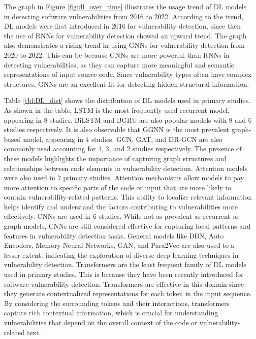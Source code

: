 The graph in Figure \ref{fig:dl_over_time} illustrates the usage trend of DL models in detecting software vulnerabilities from 2016 to 2022. According to the trend, DL models were first introduced in 2016 for vulnerability detection, since then the use of RNNs for vulnerability detection showed an upward trend. %
The graph also demonstrates a rising trend in using GNNs for vulnerability detection from 2020 to 2022. This can be because GNNs are more powerful than RNNs in detecting vulnerabilities, as they can capture more meaningful and semantic representations of input source code. Since vulnerability types often have complex structures, GNNs are an excellent fit for detecting hidden structural information.







 
Table \ref{tbl:DL_dist} shows the distribution of DL models used in primary studies. As shown in the table, LSTM is the most frequently used recurrent model, appearing in 8 studies. BiLSTM and BGRU are also popular models with 8 and 6 studies respectively. It is also observable that GGNN is the most prevalent graph-based model, appearing in 4 studies. GCN, GAT, and DR-GCN are also commonly used accounting for 4, 3, and 2 studies respectively. The presence of these models highlights the importance of capturing graph structures and relationships between code elements in vulnerability detection. Attention models were also used in 7 primary studies. Attention mechanisms allow models to pay more attention to specific parts of the code or input that are more likely to contain vulnerability-related patterns. This ability to localize relevant information helps identify and understand the factors contributing to vulnerabilities more effectively. CNNs are used in 6 studies. While not as prevalent as recurrent or graph models, CNNs are still considered effective for capturing local patterns and features in vulnerability detection tasks. General models like DBN, Auto Encoders, Memory Neural Networks, GAN, and Para2Vec are also used to a lesser extent, indicating the exploration of diverse deep learning techniques in vulnerability detection. Transformers are the least frequent family of DL models used in primary studies. This is because they have been recently introduced for software vulnerability detection. Transformers are effective in this domain since they generate contextualized representations for each token in the input sequence. By considering the surrounding tokens and their interactions, transformers capture rich contextual information, which is crucial for understanding vulnerabilities that depend on the overall context of the code or vulnerability-related text.

